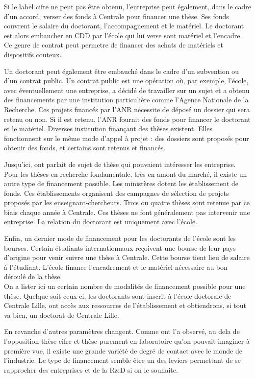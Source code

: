 \documentclass[12pt]{article}
\begin{document}
Si le label cifre ne peut pas être obtenu, l'entreprise peut également, dans le cadre d'un accord, verser des fonds à Centrale pour financer une thèse. Ses fonds couvrent le salaire du doctorant, l'accompagnement et le matériel. Le doctorant est alors embaucher en CDD par l'école qui lui verse sont matériel et l'encadre. Ce genre de contrat peut permetre de financer des achats de matériels et dispositifs couteux.

Un doctorant peut également être embauché dans le cadre d'un subvention ou d'un contrat public. Un contrat public est une opération où, par exemple, l'école, avec éventuellement une entreprise, a décidé de travailler sur un sujet et a obtenu des financements par une institution particulière comme l'Agence Nationale de la Recherche. Ces projets financés par l'ANR nécessite de déposé un dossier qui sera retenu ou non. Si il est retenu, l'ANR fournit des fonds pour financer le doctorant et le matériel. Diverses institution finançant des thèses existent. Elles fonctionnent sur le même mode d'appel à projet : des dossiers sont proposés pour obtenir des fonds, et certains sont retenus et financés.

Jusqu'ici, ont parlait de sujet de thèse qui pouvaient intéresser les entreprise. Pour les thèses en recherche fondamentale, très en amont du marché, il existe un autre type de financement possible. Les ministères dotent les établissement de fonds. Ces établissements organisent des campagnes de sélection de projets proposés par les enseignant-chercheurs. Trois ou quatre thèses sont retenue par ce biais chaque année à Centrale. Ces thèses ne font généralement pas intervenir une entreprise. La relation du doctorant est uniquement avec l'école.

Enfin, un dernier mode de financement pour les doctorants de l'école sont les bourses. Certain étudiants internationnaux reçoivent une bourse de leur pays d'origine pour venir suivre une thèse à Centrale. Cette bourse tient lieu de salaire à l'étudiant. L'école finance l'encadrement et le matériel nécessaire au bon déroulé de la thèse.\\

On a lister ici un certain nombre de modalités de financement possible pour une thèse. Quelque soit ceux-ci, les doctorants sont inscrit à l'école doctorale de Centrale Lille, ont accès aux ressources de l'établissement et obtiendrons, si tout va bien, un doctorat de Centrale Lille.

En revanche d'autres paramètres changent. Comme ont l'a observé, au dela de l'opposition thèse cifre et thèse purement en laboratoire qu'on pouvait imaginer à première vue, il existe une grande variété de degré de contact avec le monde de l'industrie. Le type de financement semble être un des leviers permettant de se rapprocher des entreprises et de la R\&D si on le souhaite.
\end{document}
